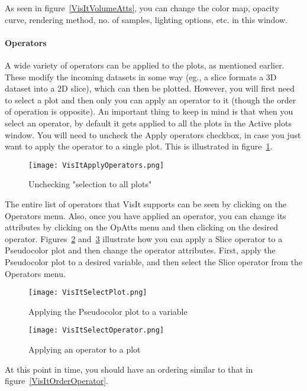 As seen in figure~\ref{VisItVolumeAtts}, you can change the color map, opacity curve, rendering method, no. of samples, lighting options, etc. in this window.

\paragraph{Operators}

A wide variety of operators can be applied to the plots, as mentioned earlier. These modify the incoming datasets in some way (eg., a slice formats a 3D dataset into a 2D slice), which can then be plotted. However, you will first need to select a plot and then only you can apply an operator to it (though the order of operation is opposite). An important thing to keep in mind is that when you select an operator, by default it gets applied to all the plots in the Active plots window. You will need to uncheck the Apply operators checkbox, in case you just want to apply the operator to a single plot. This is illustrated in figure~\ref{VisItApplyOperators}.

\begin{figure}
  \center
  \texttt{[image: VisItApplyOperators.png]}
  \caption{Unchecking "selection to all plots"}
  \label{VisItApplyOperators}
\end{figure}

The entire list of operators that VisIt supports can be seen by clicking on the Operators menu. Also, once you have applied an operator, you can change its attributes by clicking on the OpAtts menu and then clicking on the desired operator.
Figures~\ref{VisItSelectPlot} and~\ref{VisItSelectOperator} illustrate how you can apply a Slice operator to a Pseudocolor plot and then change the operator attributes.
First, apply the Pseudocolor plot to a desired variable, and then select the Slice operator from the Operators menu.

\begin{figure}
  \center
  \texttt{[image: VisItSelectPlot.png]}
  \caption{Applying the Pseudocolor plot to a variable}
  \label{VisItSelectPlot}
\end{figure}

\begin{figure}
  \center
  \texttt{[image: VisItSelectOperator.png]}
  \caption{Applying an operator to a plot}
  \label{VisItSelectOperator}
\end{figure}

At this point in time, you should have an ordering similar to that in figure~\ref{VisItOrderOperator}.  

